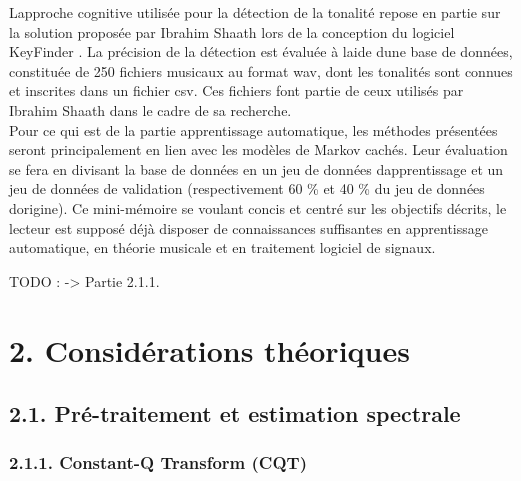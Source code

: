 \documentclass[letterpaper]{article}
\begin{document}
L\textquotesingle approche cognitive utilisée pour la détection de la tonalité repose en partie
sur la solution proposée par Ibrahim Sha\textquotesingle ath lors 
de la conception du logiciel KeyFinder \citep{IS}. La précision de la détection est évaluée 
à l\textquotesingle aide d\textquotesingle une base 
de données, constituée de 250 fichiers musicaux au format wav, dont les tonalités sont connues
et inscrites dans un fichier csv. Ces fichiers font partie de ceux utilisés par 
Ibrahim Sha\textquotesingle ath dans le cadre de sa recherche.\\

Pour ce qui est de la partie apprentissage automatique, les méthodes présentées seront principalement
en lien avec les modèles de Markov cachés. Leur évaluation se fera en divisant la base de données en
un jeu de données d\textquotesingle apprentissage et un jeu de données de validation (respectivement
60 \% et 40 \% du jeu de données d\textquotesingle origine). Ce mini-mémoire se voulant concis et 
centré sur les objectifs décrits, le lecteur est supposé déjà disposer de connaissances suffisantes en 
apprentissage automatique, en théorie musicale et en traitement logiciel de signaux.

TODO : \citep{SP} \citep{AT} -> Partie 2.1.1.

\section*{2. Considérations théoriques}

\subsection*{2.1. Pré-traitement et estimation spectrale}

\subsubsection*{2.1.1. Constant-Q Transform (CQT)}
\end{document}
